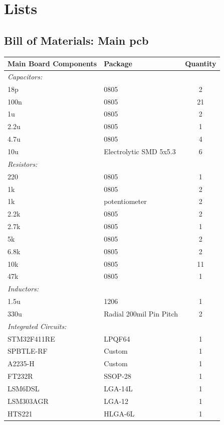 \clearpage
\section{Lists}
\subsection{Bill of Materials: Main \gls{pcb}}
\begin{center}
\begin{tabular}{|l|l|c|}
	\hline
	\bf{Main Board Components} & \bf{Package} & \bf{Quantity} \\
	\hline
	\emph{Capacitors:} & & \\
	\hline
	18p & 0805 & 2 \\
	\hline
	100n & 0805 & 21 \\
	\hline
	1u & 0805 & 2 \\
	\hline 
	2.2u & 0805 & 1 \\
	\hline 
	4.7u & 0805 & 4 \\
	\hline 
	10u & Electrolytic SMD 5x5.3 & 6 \\
	\hline
	\emph{Resistors:} & & \\
	\hline
	220 & 0805 & 1 \\
	\hline
	1k & 0805 & 2 \\
	\hline
	1k & potentiometer & 2 \\
	\hline
	2.2k & 0805 & 2 \\
	\hline
	2.7k & 0805 & 1 \\
	\hline
	5k & 0805 & 2 \\
	\hline
	6.8k & 0805 & 2 \\
	\hline
	10k & 0805 & 11 \\
	\hline
	47k & 0805 & 1 \\
	\hline
	\emph{Inductors:} & & \\
	\hline
	1.5u & 1206 & 1 \\
	\hline 
	330u & Radial 200mil Pin Pitch & 2 \\
	\hline 
	\emph{Integrated Circuits:} & & \\
	\hline
	STM32F411RE & LPQF64 & 1 \\
	\hline 
	SPBTLE-RF & Custom & 1 \\
	\hline
	A2235-H & Custom & 1 \\
	\hline
	FT232R & SSOP-28 & 1 \\
	\hline
	LSM6DSL & LGA-14L & 1 \\
	\hline
	LSM303AGR & LGA-12 & 1 \\
	\hline
	HTS221 & HLGA-6L & 1 \\

\end{tabular}
\end{center}
